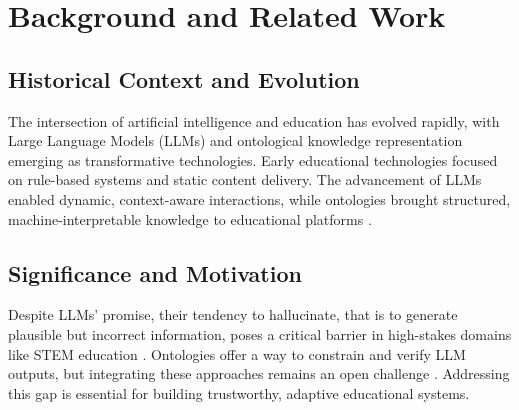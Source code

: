\chapter{Background and Related Work}
\label{chap:background}


\section{Historical Context and Evolution}

The intersection of artificial intelligence and education has evolved rapidly, with Large Language Models (LLMs) and ontological knowledge representation emerging as transformative technologies. Early educational technologies focused on rule-based systems and static content delivery. The advancement of LLMs enabled dynamic, context-aware interactions, while ontologies brought structured, machine-interpretable knowledge to educational platforms \cite{ji2023survey, zhang2024survey, doubletaken2024llm}.


\section{Significance and Motivation}

Despite LLMs' promise, their tendency to hallucinate, that is to generate plausible but incorrect information, poses a critical barrier in high-stakes domains like STEM education \cite{ji2023survey, zhang2024survey, nananukul2023halo}. Ontologies offer a way to constrain and verify LLM outputs, but integrating these approaches remains an open challenge \cite{hartl2024knowledge, enterprise2024ontologies}. Addressing this gap is essential for building trustworthy, adaptive educational systems.


